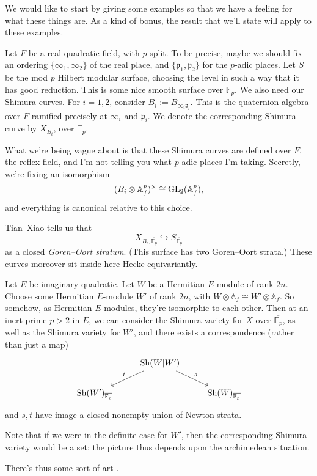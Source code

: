 \documentclass[reqno]{amsart} 
\begin{document}
We would like to start by giving some examples so that we have a feeling for what these things are.  As a kind of bonus, the result that we'll state will apply to these examples.
\begin{example}\label{example:cnpp15n4tc}
  Let $F$ be a real quadratic field, with $p$ split.  To be precise, maybe we should fix an ordering $\{\infty_1, \infty_2 \}$ of the real place, and $\{ \mathfrak{p}_1, \mathfrak{p}_2\}$ for the $p$-adic places.  Let $S$ be the mod $p$ Hilbert modular surface, choosing the level in such a way that it has good reduction.  This is some nice smooth surface over $\mathbb{F}_p$.  We also need our Shimura curves.  For $i = 1, 2$, consider $B_i := B_{\infty_i \mathfrak{p}_i}$.  This is the quaternion algebra over $F$ ramified precisely at $\infty_i$ and $\mathfrak{p}_i$.  We denote the corresponding Shimura curve by $X_{B_i}$, over $\mathbb{F}_p$.

  What we're being vague about is that these Shimura curves are defined over $F$, the reflex field, and I'm not telling you what $p$-adic places I'm taking.  Secretly, we're fixing an isomorphism
  \begin{equation*}
    (B_i \otimes \mathbb{A}_f^p )^\times \cong \operatorname{GL}_2(\mathbb{A}_f^p),
  \end{equation*}
  and everything is canonical relative to this choice.

  Tian--Xiao tells us that
  \begin{equation*}
    X_{B_i, \overline{\mathbb{F}_p}} \hookrightarrow S_{\overline{\mathbb{F}_p}}
  \end{equation*}
  as a closed \emph{Goren--Oort stratum}.  (This surface has two Goren--Oort strata.)  These curves moreover sit inside here Hecke equivariantly.
\end{example}
\begin{example}
  Let $E$ be imaginary quadratic.  Let $W$ be a Hermitian $E$-module of rank $2 n$.  Choose some Hermitian $E$-module $W'$ of rank $2 n$, with $W \otimes \mathbb{A}_f \cong W ' \otimes \mathbb{A}_f$.  So somehow, as Hermitian $E$-modules, they're isomorphic to each other.  Then at an inert prime $p > 2$ in $E$, we can consider the Shimura variety for $X$ over $\overline{\mathbb{F}_p}$, as well as the Shimura variety for $W'$, and there exists a correspondence (rather than just a map)
  \begin{equation*}
    \begin{tikzcd}
      & \operatorname{Sh}(W | W') \arrow[ld, "t"'] \arrow[rd, "s"] & \\
      \operatorname{Sh}(W')_{\overline{\mathbb{F}_p}} & & \operatorname{Sh}(W)_{\overline{\mathbb{F}_p}}
    \end{tikzcd}
  \end{equation*}
  and $s, t$ have image a closed nonempty union of Newton strata.  

  Note that if we were in the definite case for $W'$, then the corresponding Shimura variety would be a set; the picture thus depends upon the archimedean situation.

  There's thus some sort of art .
\end{example}
\end{document}
